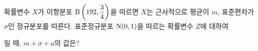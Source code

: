 확률변수 $X$가 이항분포 $\mathrm{B}\left(192{,}\mkern3mu\mathopen{}\dfrac{3}{4}\right)$을 따르면 $X$는 근사적으로 평균이 $m$, 표준편차가 $\sigma$인 정규분포를 따른다. 표준정규분포 $\mathrm{N}(0{,}\mkern3mu\mathopen{}1)$을 따르는 확률변수 $Z$에 대하여\par\smallskip{}\par\smallskip\noindent 일 때, $m+\sigma+a$의 값은? 
